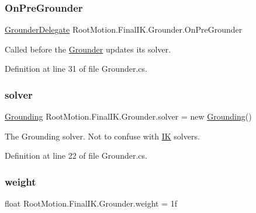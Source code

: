 \subsubsection{\texorpdfstring{On\+Pre\+Grounder}{OnPreGrounder}}
{\footnotesize\ttfamily \mbox{\hyperlink{class_root_motion_1_1_final_i_k_1_1_grounder_a1278cd21a3c872dbda95d63ac710cc26}{Grounder\+Delegate}} Root\+Motion.\+Final\+I\+K.\+Grounder.\+On\+Pre\+Grounder}



Called before the \mbox{\hyperlink{class_root_motion_1_1_final_i_k_1_1_grounder}{Grounder}} updates it\textquotesingle{}s solver. 



Definition at line 31 of file Grounder.\+cs.

\mbox{\label{class_root_motion_1_1_final_i_k_1_1_grounder_ae1f97fd6d0348de0b05834d62de1bcd9}} 
\subsubsection{\texorpdfstring{solver}{solver}}
{\footnotesize\ttfamily \mbox{\hyperlink{class_root_motion_1_1_final_i_k_1_1_grounding}{Grounding}} Root\+Motion.\+Final\+I\+K.\+Grounder.\+solver = new \mbox{\hyperlink{class_root_motion_1_1_final_i_k_1_1_grounding}{Grounding}}()}



The Grounding solver. Not to confuse with \mbox{\hyperlink{class_root_motion_1_1_final_i_k_1_1_i_k}{IK}} solvers. 



Definition at line 22 of file Grounder.\+cs.

\mbox{\label{class_root_motion_1_1_final_i_k_1_1_grounder_a129a12c892c7ced564f487e7f910c520}} 
\subsubsection{\texorpdfstring{weight}{weight}}
{\footnotesize\ttfamily float Root\+Motion.\+Final\+I\+K.\+Grounder.\+weight = 1f}



